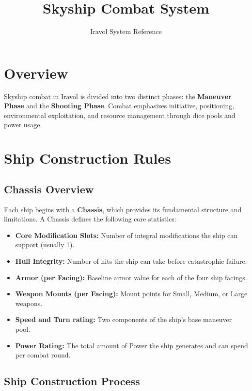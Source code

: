 \documentclass[11pt]{article}
\title{Skyship Combat System}
\author{Iravol System Reference}
\date{}
\begin{document}
\maketitle
\tableofcontents
\newpage

\section{Overview}

Skyship combat in Iravol is divided into two distinct phases: the \textbf{Maneuver Phase} and the \textbf{Shooting Phase}. Combat emphasizes initiative, positioning, environmental exploitation, and resource management through dice pools and power usage. \ShipName

\section{Ship Construction Rules}

\subsection{Chassis Overview}

Each ship begins with a \textbf{Chassis}, which provides its fundamental structure and limitations. A Chassis defines the following core statistics:

\begin{itemize}
    \item \textbf{Core Modification Slots:} Number of integral modifications the ship can support (usually 1).
    \item \textbf{Hull Integrity:} Number of hits the ship can take before catastrophic failure.
    \item \textbf{Armor (per Facing):} Baseline armor value for each of the four ship facings.
    \item \textbf{Weapon Mounts (per Facing):} Mount points for Small, Medium, or Large weapons.
	\item \textbf{Speed and Turn rating:} Two components of the ship's base maneuver pool.
    \item \textbf{Power Rating:} The total amount of Power the ship generates and can spend per combat round.
\end{itemize}

\subsection{Ship Construction Process}
\end{document}
